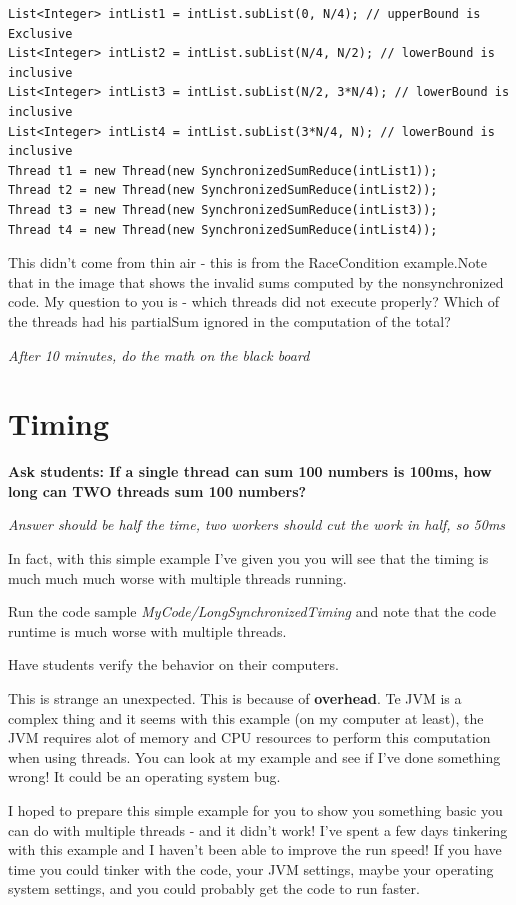 \documentclass[12pt]{article}
\begin{document}
\begin{lstlisting}
List<Integer> intList1 = intList.subList(0, N/4); // upperBound is Exclusive
List<Integer> intList2 = intList.subList(N/4, N/2); // lowerBound is inclusive
List<Integer> intList3 = intList.subList(N/2, 3*N/4); // lowerBound is inclusive
List<Integer> intList4 = intList.subList(3*N/4, N); // lowerBound is inclusive
Thread t1 = new Thread(new SynchronizedSumReduce(intList1));	
Thread t2 = new Thread(new SynchronizedSumReduce(intList2));
Thread t3 = new Thread(new SynchronizedSumReduce(intList3));
Thread t4 = new Thread(new SynchronizedSumReduce(intList4));
\end{lstlisting}

This didn't come from thin air - this is from the RaceCondition example.Note
that in the image that shows the invalid sums computed by the nonsynchronized
code. My question to you is - which threads did not execute properly? Which of
the threads had his partialSum ignored in the computation of the total?

{\Large\textit{After 10 minutes, do the math on the black board}}

\section{Timing}
{\Large \textbf{Ask students: If a single thread can sum 100 numbers is 100ms,
how long can TWO threads sum 100 numbers?}}

{\Large \textit{Answer should be half the time, two workers should cut the work
in half, so 50ms}}

In fact, with this simple example I've given you you will see that the timing is
much much much worse with multiple threads running. 

Run the code sample \textit{MyCode/LongSynchronizedTiming} and note that the
code runtime is much worse with multiple threads.

Have students verify the behavior on their computers.

This is strange an unexpected. This is because of \textbf{overhead}. Te JVM is a
complex thing and it seems with this example (on my computer at least), the JVM
requires alot of memory and CPU resources to perform this computation when using
threads. You can look at my example and see if I've done something wrong! It
could be an operating system bug. 

I hoped to prepare this simple example for you to show you something basic you
can do with multiple threads - and it didn't work! I've spent a few days
tinkering with this example and I haven't been able to improve the run speed! If
you have time you could tinker with the code, your JVM settings, maybe your
operating system settings, and you could probably get the code to run faster. 
\end{document}
